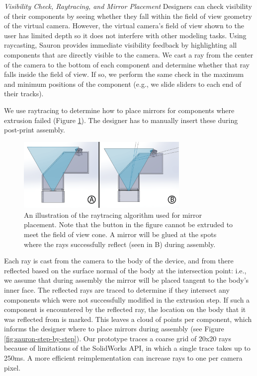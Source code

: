 \emph{Visibility Check, Raytracing, and Mirror Placement}
Designers can check visibility of their components by seeing whether they fall within the field of view geometry of the virtual camera. However, the virtual camera's field of view shown to the user has limited depth so it does not interfere with other modeling tasks. Using raycasting, Sauron  provides immediate visibility feedback by highlighting all components that are directly visible to the camera. We cast a ray from the center of the camera to the bottom of each component and determine whether that ray falls inside the field of view. If so, we perform the same check in the maximum and minimum positions of the component (e.g., we slide sliders to each end of their tracks). %

We use raytracing to determine how to place mirrors for components where extrusion failed (Figure \ref{fig:sauron-raytracing}). The designer has to manually insert these during post-print assembly. %

\begin{figure}
\centering
\includegraphics[width=3.25in]{figures/sauron/reflection.png}
\caption{An illustration of the raytracing algorithm used for mirror placement.  Note that the button in the figure cannot be extruded to meet the field of view cone.  A mirror will be glued at the spots where the rays successfully reflect (seen in B) during assembly.}
\label{fig:sauron-raytracing}
\end{figure}

Each ray is cast from the camera to the body of the device, and from there reflected  based on the surface normal of the body at the intersection point: i.e., we assume that during assembly the mirror will be placed tangent to the body's inner face. The reflected rays are traced to determine if they intersect any components which were not successfully modified in the extrusion step. If such a component is encountered by the reflected ray, the location on the body that it was reflected from is marked. This leaves a cloud of points per component, which informs the designer where to place mirrors during assembly (see Figure \ref{fig:sauron-step-by-step}). Our prototype traces a coarse grid of 
20x20 rays because of limitations of the SolidWorks API, in which a single trace takes up to 250ms. A more efficient reimplementation can increase rays to one per camera pixel.

